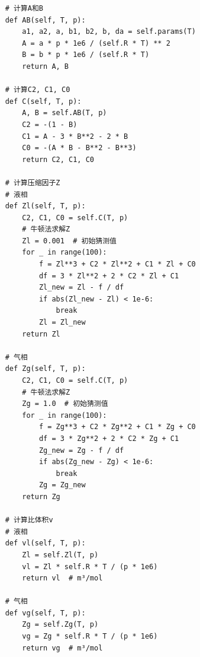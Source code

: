 \documentclass[12pt,a4paper]{article}
\begin{document}
\begin{lstlisting}
    # 计算A和B
    def AB(self, T, p):
        a1, a2, a, b1, b2, b, da = self.params(T)
        A = a * p * 1e6 / (self.R * T) ** 2
        B = b * p * 1e6 / (self.R * T)
        return A, B

    # 计算C2, C1, C0
    def C(self, T, p):
        A, B = self.AB(T, p)
        C2 = -(1 - B)
        C1 = A - 3 * B**2 - 2 * B
        C0 = -(A * B - B**2 - B**3)
        return C2, C1, C0

    # 计算压缩因子Z
    # 液相
    def Zl(self, T, p):
        C2, C1, C0 = self.C(T, p)
        # 牛顿法求解Z
        Zl = 0.001  # 初始猜测值
        for _ in range(100):
            f = Zl**3 + C2 * Zl**2 + C1 * Zl + C0
            df = 3 * Zl**2 + 2 * C2 * Zl + C1
            Zl_new = Zl - f / df
            if abs(Zl_new - Zl) < 1e-6:
                break
            Zl = Zl_new
        return Zl

    # 气相
    def Zg(self, T, p):
        C2, C1, C0 = self.C(T, p)
        # 牛顿法求解Z
        Zg = 1.0  # 初始猜测值
        for _ in range(100):
            f = Zg**3 + C2 * Zg**2 + C1 * Zg + C0
            df = 3 * Zg**2 + 2 * C2 * Zg + C1
            Zg_new = Zg - f / df
            if abs(Zg_new - Zg) < 1e-6:
                break
            Zg = Zg_new
        return Zg

    # 计算比体积v
    # 液相
    def vl(self, T, p):
        Zl = self.Zl(T, p)
        vl = Zl * self.R * T / (p * 1e6)
        return vl  # m³/mol

    # 气相
    def vg(self, T, p):
        Zg = self.Zg(T, p)
        vg = Zg * self.R * T / (p * 1e6)
        return vg  # m³/mol


\end{lstlisting}
\end{document}
